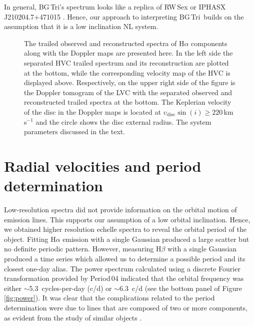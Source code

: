 \documentclass[fleqn,usenatbib]{mnras}
\def\bg{BG\,Tri}
\begin{document}
In general, \bg's spectrum looks like a replica of RW\,Sex \citep{2017MNRAS.470.1960H} or IPHASX\,J210204.7+471015 \citep{2018ApJ...857...80G}. Hence, our approach to interpreting  \bg\  builds on the assumption that it is a low inclination NL system.




\begin{figure*}
\setlength{\unitlength}{1mm}
\caption{The trailed observed and reconstructed  spectra of H$\alpha$ components along with the Doppler maps are presented here. 
In the left side  the separated HVC trailed spectrum and its reconstruction are plotted at the bottom, while the corresponding velocity 
map of the HVC is displayed above. Respectively, on the upper right side of the figure is the Doppler tomogram of the LVC with the 
separated observed and reconstructed trailed spectra at the bottom.  
The Keplerian velocity of the disc in the Doppler maps is located at  $ \upsilon_{\mathrm {disc}}\sin (i) \ge 220$\,km\,s$^{-1}$ and 
the circle shows the disc external radius. The system parameters discussed in the text.
}
\label{fig:tomo}
\end{figure*}


\section{Radial velocities and period determination }
\label{sec:period}

Low-resolution spectra did not provide information on the orbital motion of emission lines.  This supports our assumption of a low orbital
inclination. Hence, we obtained higher resolution echelle spectra to reveal the orbital period of the object.   
Fitting H$\alpha$  emission with a single Gaussian produced a large scatter but no definite periodic pattern. 
However, measuring H$\beta$ with a single Gaussian produced a time series which allowed us to determine a possible period and its closest
one-day alias. The power spectrum calculated using a discrete Fourier transformation provided by  Period\,04
\citep{2014ascl.soft07009L,2005CoAst.146...53L} indicated that the orbital frequency was either $\sim$5.3~cycles-per-day (c/d) or
$\sim$6.3~c/d (see the bottom panel of Figure\,\ref{fig:power}). It was clear that the complications related to the period determination 
were due to lines that are composed of two or more components, as evident from the study of similar objects
\citep{2017MNRAS.470.1960H,2018ApJ...857...80G}.  
\end{document}

